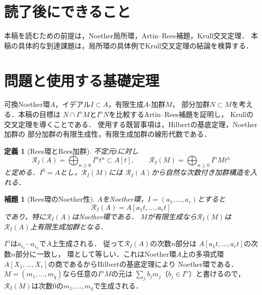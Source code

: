 \documentclass[a5paper,10pt,onecolumn]{jsarticle}
\makeatletter
\theoremstyle{mathnotetheorem}
\newtheorem{definition}[theorem]{定義}
\newtheorem{lemma}[theorem]{補題}
\renewcommand{\proofname}{証明}
\renewenvironment{proof}[1][\proofname]{%
  \par\pushQED{\qed}\normalfont\topsep4\p@\@plus2\p@\relax
  \trivlist\item[\hskip\labelsep\bfseries #1]\ignorespaces
}{\popQED\endtrivlist\@endpefalse}
\makeatother
\begin{document}
\section*{読了後にできること}
本稿を読むための前提は，Noether局所環，Artin--Rees補題，Krull交叉定理．
本稿の具体的な到達課題は，局所環の具体例でKrull交叉定理の結論を検算する．

\section{問題と使用する基礎定理}
可換Noether環$A$，イデアル$I\subset A$，有限生成$A$-加群$M$，
部分加群$N\subset M$を考える．本稿の目標は
$N\cap I^nM$と$I^nN$を比較するArtin--Rees補題を証明し，
Krullの交叉定理を導くことである．
使用する既習事項は，Hilbertの基底定理，Noether加群の
部分加群の有限生成性，有限生成加群の線形代数である．

\begin{definition}[Rees環とRees加群]
不定元$t$に対し
\[
 \mathcal R_I(A)=\bigoplus_{n\ge0}I^nt^n\subset A[t],
 \qquad
 \mathcal R_I(M)=\bigoplus_{n\ge0}I^nMt^n
\]
と定める．$I^0=A$とし，$\mathcal R_I(M)$には
$\mathcal R_I(A)$から自然な次数付き加群構造を入れる．
\end{definition}

\begin{lemma}[Rees環のNoether性]\label{lem:rees}
$A$をNoether環，$I=(a_1,\ldots,a_r)$とすると
\[
 \mathcal R_I(A)=A[a_1t,\ldots,a_rt]
\]
であり，特に$\mathcal R_I(A)$はNoether環である．
$M$が有限生成なら$\mathcal R_I(M)$は
$\mathcal R_I(A)$上有限生成加群となる．
\end{lemma}
\begin{proof}
$I^n$は$a_{i_1}\cdots a_{i_n}$で$A$上生成される．
従って$\mathcal R_I(A)$の次数$n$部分は
$A[a_1t,\ldots,a_rt]$の次数$n$部分に一致し，
環として等しい．これはNoether環$A$上の多項式環
$A[X_1,\ldots,X_r]$の商であるからHilbertの基底定理により
Noether環である．
$M=(m_1,\ldots,m_q)$なら任意の$I^nM$の元は
$\sum_j b_jm_j$（$b_j\in I^n$）と書けるので，
$\mathcal R_I(M)$は次数0の$m_1,\ldots,m_q$で生成される．
\end{proof}
\end{document}
